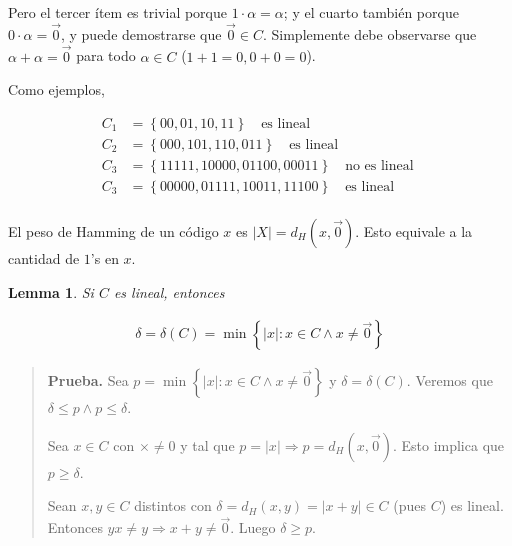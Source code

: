\documentclass[a4paper]{article}
\newtheorem{lemma}{Lemma}
\newtheorem{lemma}{Lemma}
\begin{document}
Pero el tercer ítem es trivial porque $1 \cdot \alpha = \alpha$; y el cuarto
también porque $0 \cdot \alpha = \overrightarrow{0}$, y puede demostrarse que
$\overrightarrow{0} \in C$. Simplemente debe observarse que 
$\alpha + \alpha = \overrightarrow{0}$ para todo $\alpha \in C$ ($1 + 1 = 0, 0 + 0 = 0$).

Como ejemplos, 

\begin{align*}
    C_1 &= \left\{ 00, 01, 10, 11 \right\}  ~ ~ ~ \text{ es lineal }\\
    C_2 &= \left\{ 000, 101, 110, 011 \right\}  ~ ~ ~ \text{ es lineal }\\
    C_3 &= \left\{ 11111, 10000, 01100, 00011 \right\}  ~ ~ ~ \text{ no es lineal }\\
    C_3 &= \left\{ 00000, 01111, 10011, 11100 \right\}  ~ ~ ~ \text{ es lineal }\\
\end{align*}

\begin{definition}
    El peso de Hamming de un código $x$ es $|X| = d_H(x, \overrightarrow{0})$. Esto
    equivale a la cantidad de $1$'s en $x$.
\end{definition}

\begin{lemma}
    Si $C$ es lineal, entonces 

    \begin{align*}
        \delta = \delta(C) = \min \left\{ |x| : x \in C \land  x \neq \overrightarrow{0} \right\} 
    \end{align*}
\end{lemma}


\small
\begin{quote}

\textbf{Prueba.} Sea $ p = \min \left\{ |x| : x \in  C \land  x \neq
\overrightarrow{0} \right\} $ y $\delta = \delta(C)$. Veremos que $\delta \leq
p \land  p \leq \delta$. 

Sea $x \in C$ con $\times  \neq 0$ y tal que $p = |x| \Rightarrow p = d_H(x,
\overrightarrow{0})$. Esto implica que $p \geq \delta$.

Sean $x, y \in C$ distintos con $\delta = d_H(x, y) = |x + y| \in C$ (pues $C$) es lineal. Entonces $yx \neq y \Rightarrow x+y \neq \overrightarrow{0}$. Luego $\delta \geq p$.



\end{quote}
\normalsize
\end{document}
